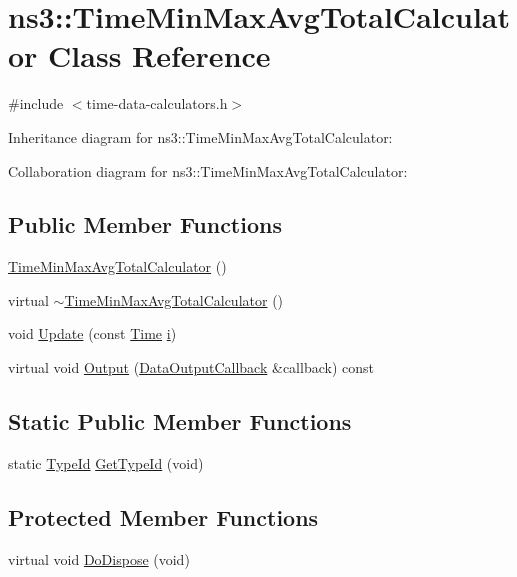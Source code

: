 \hypertarget{classns3_1_1TimeMinMaxAvgTotalCalculator}{}\section{ns3\+:\+:Time\+Min\+Max\+Avg\+Total\+Calculator Class Reference}
\label{classns3_1_1TimeMinMaxAvgTotalCalculator}


{\ttfamily \#include $<$time-\/data-\/calculators.\+h$>$}



Inheritance diagram for ns3\+:\+:Time\+Min\+Max\+Avg\+Total\+Calculator\+:


Collaboration diagram for ns3\+:\+:Time\+Min\+Max\+Avg\+Total\+Calculator\+:
\subsection*{Public Member Functions}
\begin{DoxyCompactItemize}
\item 
\hyperlink{classns3_1_1TimeMinMaxAvgTotalCalculator_aaabeaf158cf5fa7ae36819c7527143c6}{Time\+Min\+Max\+Avg\+Total\+Calculator} ()
\item 
virtual \hyperlink{classns3_1_1TimeMinMaxAvgTotalCalculator_a734309128a9981289203fc230b77295a}{$\sim$\+Time\+Min\+Max\+Avg\+Total\+Calculator} ()
\item 
void \hyperlink{classns3_1_1TimeMinMaxAvgTotalCalculator_a2e64d983eedc53c5d22f5e44de731c3b}{Update} (const \hyperlink{classns3_1_1Time}{Time} \hyperlink{lte__uplink__power__control_8m_a6f6ccfcf58b31cb6412107d9d5281426}{i})
\item 
virtual void \hyperlink{classns3_1_1TimeMinMaxAvgTotalCalculator_ac13bfea0dd717448ba376edd22928af8}{Output} (\hyperlink{classns3_1_1DataOutputCallback}{Data\+Output\+Callback} \&callback) const 
\end{DoxyCompactItemize}
\subsection*{Static Public Member Functions}
\begin{DoxyCompactItemize}
\item 
static \hyperlink{classns3_1_1TypeId}{Type\+Id} \hyperlink{classns3_1_1TimeMinMaxAvgTotalCalculator_aa96d354375f22f509ce3aab25ac3866b}{Get\+Type\+Id} (void)
\end{DoxyCompactItemize}
\subsection*{Protected Member Functions}
\begin{DoxyCompactItemize}
\item 
virtual void \hyperlink{classns3_1_1TimeMinMaxAvgTotalCalculator_a60317a5c20da1d5b8b951035ee451ad3}{Do\+Dispose} (void)
\end{DoxyCompactItemize}
